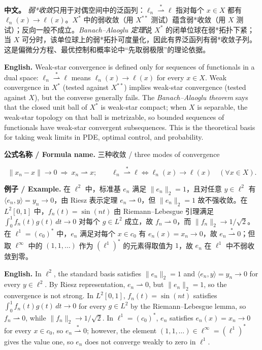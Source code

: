 \documentclass[UTF8,11pt,a4paper]{ctexart}
\newcommand{\EN}[1]{\par\noindent \textbf{English.} #1\par}
\newcommand{\FORMULA}[2]{\par\noindent\textbf{公式名称 / Formula name.} #1 / #2\par}
\newcommand{\EX}[2]{\par\noindent \textbf{例子 / Example.} #1\par\EN{#2}}
\newcommand{\APS}[2]{\par\noindent\textbf{中文。} #1\par\noindent\textbf{English.} #2\par\smallskip}
\begin{document}
\APS{\emph{弱*收敛}只用于对偶空间中的泛函列：$\ell_n\stackrel{*}{\rightharpoonup}\ell$ 指对每个 $x\in X$ 都有 $\ell_n(x)\to\ell(x)$。$X^*$ 中的弱收敛（用 $X^{**}$ 测试）蕴含弱*收敛（用 $X$ 测试）；反向一般不成立。\emph{Banach--Alaoglu 定理}说 $X^*$ 的闭单位球在弱*拓扑下紧；当 $X$ 可分时，该单位球上的弱*拓扑可度量化，因此有界泛函列有弱*收敛子列。这是偏微分方程、最优控制和概率论中“先取弱极限”的理论依据。}{Weak-star convergence is defined only for sequences of functionals in a dual space: $\ell_n\stackrel{*}{\rightharpoonup}\ell$ means $\ell_n(x)\to\ell(x)$ for every $x\in X$. Weak convergence in $X^*$ (tested against $X^{**}$) implies weak-star convergence (tested against $X$), but the converse generally fails. The \emph{Banach--Alaoglu theorem} says that the closed unit ball of $X^*$ is weak-star compact; when $X$ is separable, the weak-star topology on that ball is metrizable, so bounded sequences of functionals have weak-star convergent subsequences. This is the theoretical basis for taking weak limits in PDE, optimal control, and probability.}
\FORMULA{三种收敛}{three modes of convergence}
\[
\|x_n-x\|\to0\ \Longrightarrow\ x_n\rightharpoonup x;
\qquad
\ell_n\stackrel{*}{\rightharpoonup}\ell
\Longleftrightarrow
\ell_n(x)\to\ell(x)\quad(\forall x\in X).
\]

\EX{在 $\ell^2$ 中，标准基 $e_n$ 满足 $\|e_n\|_2=1$，且对任意 $y\in\ell^2$ 有 $\langle e_n,y\rangle=y_n\to0$，由 Riesz 表示定理 $e_n\rightharpoonup0$，但 $\|e_n\|_2=1$ 故不强收敛。在 $L^2[0,1]$ 中，$f_n(t)=\sin(nt)$ 由 Riemann--Lebesgue 引理满足 $\int_0^1f_n(t)g(t)\,dt\to0$ 对每个 $g\in L^2$ 成立，故 $f_n\rightharpoonup0$，而 $\|f_n\|_2\to1/\sqrt2$。在 $\ell^1=(c_0)^*$ 中，$e_n$ 满足对每个 $x\in c_0$ 有 $e_n(x)=x_n\to0$，故 $e_n\stackrel{*}{\rightharpoonup}0$；但取 $\ell^\infty$ 中的 $(1,1,\ldots)$ 作为 $( \ell^1)^*$ 的元素得取值为 $1$，故 $e_n$ 在 $\ell^1$ 中不弱收敛到零。}{In $\ell^2$, the standard basis satisfies $\|e_n\|_2=1$ and $\langle e_n,y\rangle=y_n\to0$ for every $y\in\ell^2$. By Riesz representation, $e_n\rightharpoonup0$, but $\|e_n\|_2=1$, so the convergence is not strong. In $L^2[0,1]$, $f_n(t)=\sin(nt)$ satisfies $\int_0^1f_n(t)g(t)\,dt\to0$ for every $g\in L^2$ by the Riemann--Lebesgue lemma, so $f_n\rightharpoonup0$, while $\|f_n\|_2\to1/\sqrt2$. In $\ell^1=(c_0)^*$, $e_n$ satisfies $e_n(x)=x_n\to0$ for every $x\in c_0$, so $e_n\stackrel{*}{\rightharpoonup}0$; however, the element $(1,1,\ldots)\in\ell^\infty=(\ell^1)^*$ gives the value one, so $e_n$ does not converge weakly to zero in $\ell^1$.}
\end{document}
